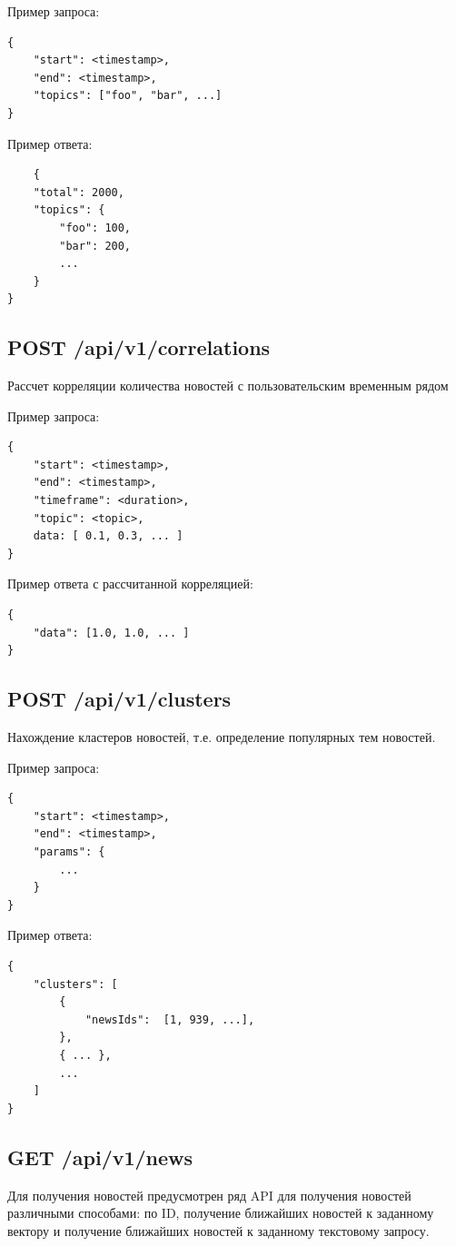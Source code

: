 Пример запроса:
\begin{lstlisting}
{
    "start": <timestamp>,
    "end": <timestamp>,
    "topics": ["foo", "bar", ...]
}
\end{lstlisting}

Пример ответа:
\begin{lstlisting}
    {
    "total": 2000,
    "topics": {
        "foo": 100,
        "bar": 200,
        ...
    }
}
\end{lstlisting}

\subsection{POST /api/v1/correlations}
Рассчет корреляции количества новостей с пользовательским временным рядом

Пример запроса:
\begin{lstlisting}
{
    "start": <timestamp>,
    "end": <timestamp>,
    "timeframe": <duration>,
    "topic": <topic>,
    data: [ 0.1, 0.3, ... ]
}
\end{lstlisting}

Пример ответа с рассчитанной корреляцией:
\begin{lstlisting}
{
    "data": [1.0, 1.0, ... ]
}
\end{lstlisting}

\subsection{POST /api/v1/clusters}
Нахождение кластеров новостей, т.е. определение популярных тем новостей.

Пример запроса:
\begin{lstlisting}
{
    "start": <timestamp>,
    "end": <timestamp>,
    "params": {
        ...
    }
}
\end{lstlisting}

Пример ответа:
\begin{lstlisting}
{
    "clusters": [
        {
            "newsIds":  [1, 939, ...],
        },
        { ... },
        ...
    ]
}
\end{lstlisting}

\subsection{GET /api/v1/news}
Для получения новостей предусмотрен ряд API для получения новостей различными способами: по ID, получение ближайших новостей к заданному вектору и получение ближайших новостей к заданному текстовому запросу.

